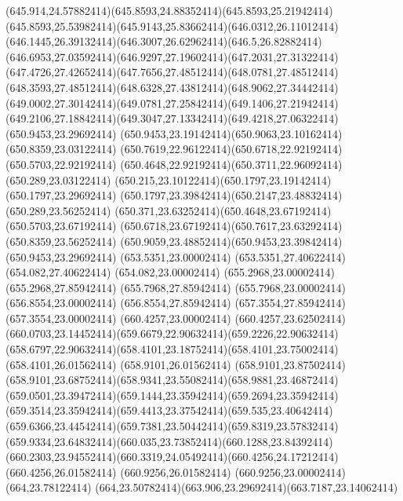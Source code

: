 {{	\curveto(645.914,24.57882414)(645.8593,24.88352414)(645.8593,25.21942414)
	\curveto(645.8593,25.53982414)(645.9143,25.83662414)(646.0312,26.11012414)
	\curveto(646.1445,26.39132414)(646.3007,26.62962414)(646.5,26.82882414)
	\curveto(646.6953,27.03592414)(646.9297,27.19602414)(647.2031,27.31322414)
	\curveto(647.4726,27.42652414)(647.7656,27.48512414)(648.0781,27.48512414)
	\curveto(648.3593,27.48512414)(648.6328,27.43812414)(648.9062,27.34442414)
	\curveto(649.0002,27.30142414)(649.0781,27.25842414)(649.1406,27.21942414)
	\curveto(649.2106,27.18842414)(649.3047,27.13342414)(649.4218,27.06322414)
	\closepath
	\moveto(650.9453,23.29692414)
	\curveto(650.9453,23.19142414)(650.9063,23.10162414)(650.8359,23.03122414)
	\curveto(650.7619,22.96122414)(650.6718,22.92192414)(650.5703,22.92192414)
	\curveto(650.4648,22.92192414)(650.3711,22.96092414)(650.289,23.03122414)
	\curveto(650.215,23.10122414)(650.1797,23.19142414)(650.1797,23.29692414)
	\curveto(650.1797,23.39842414)(650.2147,23.48832414)(650.289,23.56252414)
	\curveto(650.371,23.63252414)(650.4648,23.67192414)(650.5703,23.67192414)
	\curveto(650.6718,23.67192414)(650.7617,23.63292414)(650.8359,23.56252414)
	\curveto(650.9059,23.48852414)(650.9453,23.39842414)(650.9453,23.29692414)
	\closepath
	\moveto(653.5351,23.00002414)
	\lineto(653.5351,27.40622414)
	\lineto(654.082,27.40622414)
	\lineto(654.082,23.00002414)
	\closepath
	\moveto(655.2968,23.00002414)
	\lineto(655.2968,27.85942414)
	\lineto(655.7968,27.85942414)
	\lineto(655.7968,23.00002414)
	\closepath
	\moveto(656.8554,23.00002414)
	\lineto(656.8554,27.85942414)
	\lineto(657.3554,27.85942414)
	\lineto(657.3554,23.00002414)
	\closepath
	\moveto(660.4257,23.00002414)
	\lineto(660.4257,23.62502414)
	\curveto(660.0703,23.14452414)(659.6679,22.90632414)(659.2226,22.90632414)
	\curveto(658.6797,22.90632414)(658.4101,23.18752414)(658.4101,23.75002414)
	\lineto(658.4101,26.01562414)
	\lineto(658.9101,26.01562414)
	\lineto(658.9101,23.87502414)
	\curveto(658.9101,23.68752414)(658.9341,23.55082414)(658.9881,23.46872414)
	\curveto(659.0501,23.39472414)(659.1444,23.35942414)(659.2694,23.35942414)
	\curveto(659.3514,23.35942414)(659.4413,23.37542414)(659.535,23.40642414)
	\curveto(659.6366,23.44542414)(659.7381,23.50442414)(659.8319,23.57832414)
	\curveto(659.9334,23.64832414)(660.035,23.73852414)(660.1288,23.84392414)
	\curveto(660.2303,23.94552414)(660.3319,24.05492414)(660.4256,24.17212414)
	\lineto(660.4256,26.01582414)
	\lineto(660.9256,26.01582414)
	\lineto(660.9256,23.00002414)
	\closepath
	\moveto(664,23.78122414)
	\curveto(664,23.50782414)(663.906,23.29692414)(663.7187,23.14062414)
}}
